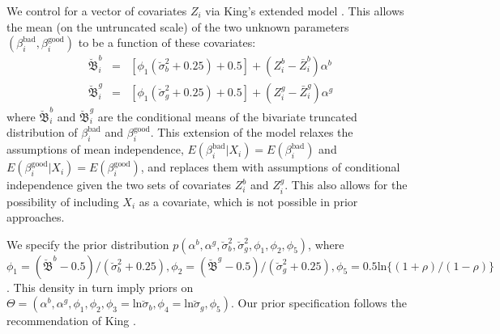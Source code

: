 \documentclass[11pt,titlepage]{article}
\newcommand{\bbetau}{\breve{\mathfrak B}}
\newcommand{\sigmau}{\breve{\sigma}}
\newcommand{\bb}{\beta^{\text{bad}}}
\newcommand{\bg}{\beta^{\text{good}}}
\begin{document}
We control for a vector of covariates $Z_i$ via King's extended model
\cite[Ch.\ 9]{king:97}.  This allows the mean (on the untruncated
scale) of the two unknown parameters $(\bb_i, \bg_i)$ to be a function
of these covariates:
\begin{eqnarray}
\bbetau_i^b & = & [\phi_1 (\sigmau^2_b + 0.25) + 0.5] + (Z_i^b -
\bar{Z}_i^b) \alpha^b \\
\bbetau_i^g & = & [\phi_1 (\sigmau^2_g + 0.25) + 0.5] + (Z_i^g -
\bar{Z}_i^g) \alpha^g
\end{eqnarray}
where $\bbetau_i^b$ and $\bbetau_i^g$ are the conditional means of the
bivariate truncated distribution of $\bb_i$ and $\bg_i$.  This
extension of the model relaxes the assumptions of mean independence,
$E(\bb_i|X_i)=E(\bb_i)$ and $E(\bg_i|X_i)=E(\bg_i)$, and replaces them
with assumptions of conditional independence given the two sets of
covariates $Z_i^b$ and $Z_i^g$.  This also allows for the possibility
of including $X_i$ as a covariate, which is not possible in prior
approaches. 

We specify the prior distribution $p(\alpha^b, \alpha^g, \sigmau^2_b,
\sigmau^2_g, \phi_1, \phi_2, \phi_5)$, where
$\phi_1=(\bbetau^b-0.5)/(\sigmau_b^2+0.25),
\phi_2=(\bbetau^g-0.5)/(\sigmau_g^2+0.25), \phi_5=0.5
\text{ln}\{(1+\rho)/(1-\rho)\}$. This density in turn imply priors on
$\Theta=(\alpha^b, \alpha^g, \phi_1, \phi_2,
\phi_3=\text{ln}\sigmau_b, \phi_4=\text{ln}\sigmau_g, \phi_5)$.  Our
prior specification follows the recommendation of King
\citeyear[chapter7]{king:97}.

\newpage
\singlespacing

% 

\end{document}
